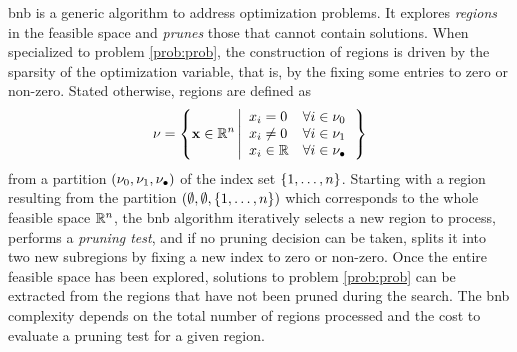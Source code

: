 \documentclass[11pt]{article}
\begin{document}
\gls{bnb} is a generic algorithm to address optimization problems.
It explores \emph{regions} in the feasible space and \emph{prunes} those that cannot contain solutions.
When specialized to problem \eqref{prob:prob}, the construction of regions is driven by the sparsity of the optimization variable, that is, by the fixing some entries to zero or non-zero.
Stated otherwise, regions are defined as
\begin{equation}
    \label{eq:region}
    \nodesymbol = \left\{
        \pv \in \kR^{\pdim}
        \left|
        \begin{array}{ll}
            \pvi{\idxentry} = 0 &\forall \idxentry \in \setzero \\
            \pvi{\idxentry} \neq 0 &\forall \idxentry \in \setone \\
            \pvi{\idxentry} \in \kR &\forall \idxentry \in \setnone
        \end{array}
        \right.
    \right\}
\end{equation}
from a partition $(\nu_0,\nu_1,\nu_\bullet)$ of the index set $\{1,\dots,n\}$.
Starting with a region resulting from the partition $(\emptyset,\emptyset,\{1,\dots,n\})$ which corresponds to the whole feasible space $\kR^{\pdim}$, the \gls{bnb} algorithm iteratively selects a new region to process, performs a \emph{pruning test}, and if no pruning decision can be taken, splits it into two new subregions by fixing a new index to zero or non-zero.
Once the entire feasible space has been explored, solutions to problem \eqref{prob:prob} can be extracted from the regions that have not been pruned during the search.
The \gls{bnb} complexity depends on the total number of regions processed and the cost to evaluate a pruning test for a given region.
\end{document}
